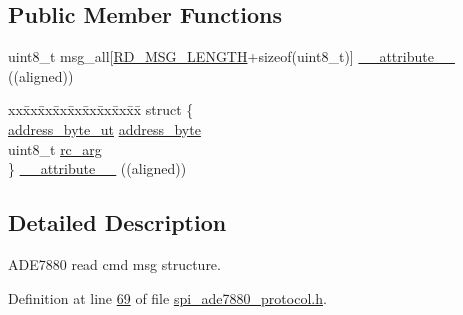 \subsection*{Public Member Functions}
\begin{DoxyCompactItemize}
\item 
uint8\-\_\-t msg\-\_\-all\mbox{[}\hyperlink{a00041_a0f0795755fb9e8e47c78c1289e091282}{R\-D\-\_\-\-M\-S\-G\-\_\-\-L\-E\-N\-G\-T\-H}+sizeof(uint8\-\_\-t)\mbox{]} \hyperlink{a00015_a047d684c62baf0b9b27c17bf0cde7b34}{\-\_\-\-\_\-attribute\-\_\-\-\_\-} ((aligned))
\item 
\begin{tabbing}
xx\=xx\=xx\=xx\=xx\=xx\=xx\=xx\=xx\=\kill
struct \{\\
\>\hyperlink{a00011}{address\_byte\_ut} \hyperlink{a00015_af6a65bac733ea3e9b1d24b065163d49a}{address\_byte}\\
\>uint8\_t \hyperlink{a00015_aa11432305021ed2018866e1f8e990c34}{rc\_arg}\\
\} \hyperlink{a00015_a780d74597410efb8fb3d8ab129db732c}{\_\_attribute\_\_} ((aligned))\\

\end{tabbing}\end{DoxyCompactItemize}


\subsection{Detailed Description}
A\-D\-E7880 read cmd msg structure. 

Definition at line \hyperlink{a00041_source_l00069}{69} of file \hyperlink{a00041_source}{spi\-\_\-ade7880\-\_\-protocol.\-h}.




